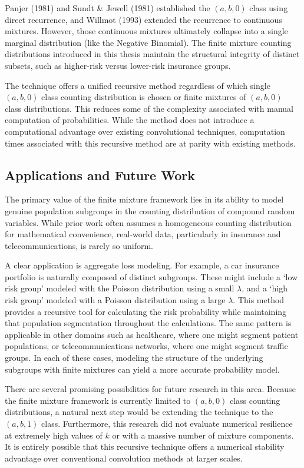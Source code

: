 \documentclass[11pt]{amsart}
\theoremstyle{definition}
\theoremstyle{plain}
\begin{document}
Panjer (1981) and Sundt \& Jewell (1981) established the $(a, b, 0)$ class using direct
recurrence, and Willmot (1993) extended the recurrence to continuous mixtures. However,
those continuous mixtures ultimately collapse into a single marginal distribution (like the
Negative Binomial). The finite mixture counting distributions introduced in this thesis
maintain the structural integrity of distinct subsets, such as higher-risk versus lower-risk
insurance groups.

The technique offers a unified recursive method regardless of which single $(a, b, 0)$ class
counting distribution is chosen or finite mixtures of $(a, b, 0)$ class distributions. This
reduces some of the complexity associated with manual computation of probabilities. While
the method does not introduce a computational advantage over existing convolutional
techniques, computation times associated with this recursive method are at parity with
existing methods.

\subsection{Applications and Future Work}

The primary value of the finite mixture framework lies in its ability to model genuine
population subgroups in the counting distribution of compound random variables. While
prior work often assumes a homogeneous counting distribution for mathematical
convenience, real-world data, particularly in insurance and telecommunications, is rarely
so uniform.

A clear application is aggregate loss modeling. For example, a car insurance portfolio is
naturally composed of distinct subgroups. These might include a `low risk group' modeled
with the Poisson distribution using a small $\lambda$, and a `high risk group' modeled with
a Poisson distribution using a large $\lambda$. This method provides a recursive tool for
calculating the risk probability while maintaining that population segmentation throughout
the calculations. The same pattern is applicable in other domains such as healthcare,
where one might segment patient populations, or telecommunications networks, where one
might segment traffic groups. In each of these cases, modeling the structure of the
underlying subgroups with finite mixtures can yield a more accurate probability model.

There are several promising possibilities for future research in this area. Because the
finite mixture framework is currently limited to $(a, b, 0)$ class counting distributions, a
natural next step would be extending the technique to the $(a, b, 1)$ class. Furthermore,
this research did not evaluate numerical resilience at extremely high values of $k$ or with
a massive number of mixture components. It is entirely possible that this recursive
technique offers a numerical stability advantage over conventional convolution methods at
larger scales.
\end{document}
